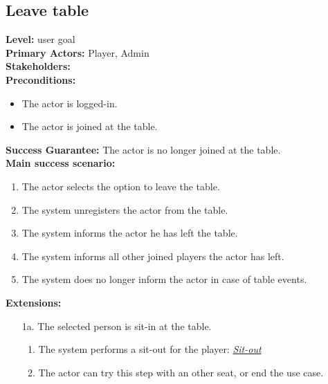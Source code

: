 \documentclass[a4paper,11pt]{report}
\begin{document}
\subsection{Leave table}
\textbf{Level:} user goal \\
\textbf{Primary Actors:} Player, Admin \\
\textbf{Stakeholders:} \\
\textbf{Preconditions:}
\begin{itemize}
\item The actor is logged-in.
\item The actor is joined at the table.
\end{itemize}
\textbf{Success Guarantee:} The actor is no longer joined at the table. \\
\textbf{Main success scenario:} 
\begin{enumerate}
\item The actor selects the option to leave the table.
\item The system unregisters the actor from the table.
\item The system informs the actor he has left the table. 
\item The system informs all other joined players the actor has left. 
\item The system does no longer inform the actor in case of table events.
\end{enumerate}
\textbf{Extensions:}
\begin{itemize}
\item[1a.] The selected person is sit-in at the table. 
\begin{enumerate}
\item The system performs a sit-out for the player: \emph{\underline{Sit-out}}
\item The actor can try this step with an other seat, or end the use case.
\end{enumerate}
\end{itemize}
\end{document}
